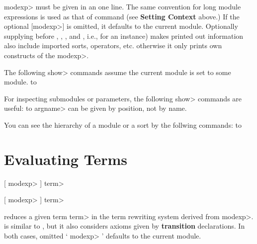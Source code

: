 \<modexp> must be given in an one line. 
The same convention for long module expressions is used as that of
 command (see {\bf Setting Context} above.)
If the optional [\<modexp>] is omitted, it defaults to the current
module. 
Optionally supplying  before , ,  
, and , i.e.,  for an instance)
makes printed out information also include imported sorts, operators, etc.
otherwise it only prints own constructs of the \<modexp>.

The following \<show> commands assume the current
module is set to some module.
\paralign to 

For inspecting submodules or parameters, the following \<show>
commands are useful:
\paralign to 
\<argname> can be given by position, not by name. 

You can see the hierarchy of a module or a sort by the follwing
 commands:
\paralign to 

\section{Evaluating Terms}

 [ \<modexp> \kbd{:}] \<term> 

 [ \<modexp> \kbd{:}] \<term> 

 reduces a given term \<term> in the term rewriting system
derived from \<modexp>.
 is similar to , but it also considers axioms 
given by {\bf transition} declarations.
In both cases, omitted ` \<modexp> \kbd{:}' defaults to the current module.

